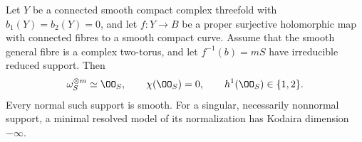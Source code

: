 \begin{proposition}\hypertarget{tag-02WJ}{}\label{night:P4.12}\label{stmt:P4.12}

Let $Y$ be a connected smooth compact complex threefold with
$b_1(Y)=b_2(Y)=0$, and let $f:Y\to B$ be a proper surjective
holomorphic map with connected fibres to a smooth compact curve.
Assume that the smooth general fibre is a complex two-torus, and let
$f^{-1}(b)=mS$ have irreducible reduced support. Then
\[
 \omega_S^{\otimes m}\simeq\OO_S,\qquad
 \chi(\OO_S)=0,\qquad h^1(\OO_S)\in\{1,2\}.
\]
Every normal such support is smooth. For a singular, necessarily
nonnormal support, a minimal resolved model of its normalization
has Kodaira dimension $-\infty$.
\end{proposition}
